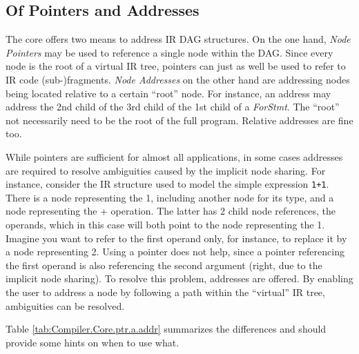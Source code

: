 \subsection{Of Pointers and Addresses}
\label{sec:Compiler.Core.PointersAndAddresses}

The core offers two means to address IR DAG structures. On the one hand,
\textit{Node Pointers} may be used to reference a single node within the DAG.
Since every node is the root of a virtual IR tree, pointers can just as well be
used to refer to IR code (sub-)fragments. \textit{Node Addresses} on the other
hand are addressing nodes being located relative to a certain ``root'' node. For
instance, an address may address the 2nd child of the 3rd child of the 1st child
of a \textit{ForStmt}. The ``root'' not necessarily need to be the root of the
full program. Relative addresses are fine too.


While pointers are sufficient for almost all applications, in some cases
addresses are required to resolve ambiguities caused by the implicit node
sharing. For instance, consider the IR structure used to model the simple
expression \lstinline|1+1|. There is a node representing the 1, including
another node for its type, and a node representing the + operation. The latter
has 2 child node references, the operands, which in this case will both point to
the node representing the 1. Imagine you want to refer to the first operand
only, for instance, to replace it by a node representing 2. Using a pointer does
not help, since a pointer referencing the first operand is also referencing the
second argument (right, due to the implicit node sharing). To resolve this
problem, addresses are offered. By enabling the user to address a node by
following a path within the ``virtual'' IR tree, ambiguities can be resolved.


Table \ref{tab:Compiler.Core.ptr.a.addr} summarizes the differences and
should provide some hints on when to use what.

